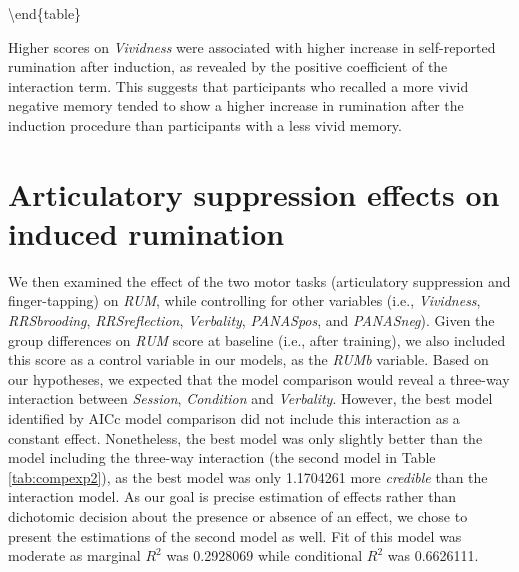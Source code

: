 \documentclass[12pt,]{book}
\theoremstyle{definition}
\theoremstyle{definition}
\theoremstyle{definition}
\theoremstyle{remark}
\begin{document}
\textbackslash{}end\{table\}

Higher scores on \emph{Vividness} were associated with higher increase
in self-reported rumination after induction, as revealed by the positive
coefficient of the interaction term. This suggests that participants who
recalled a more vivid negative memory tended to show a higher increase
in rumination after the induction procedure than participants with a
less vivid memory.

\section{Articulatory suppression effects on induced
rumination}\label{articulatory-suppression-effects-on-induced-rumination-1}

We then examined the effect of the two motor tasks (articulatory
suppression and finger-tapping) on \emph{RUM}, while controlling for
other variables (i.e., \emph{Vividness}, \emph{RRSbrooding},
\emph{RRSreflection}, \emph{Verbality}, \emph{PANASpos}, and
\emph{PANASneg}). Given the group differences on \emph{RUM} score at
baseline (i.e., after training), we also included this score as a
control variable in our models, as the \emph{RUMb} variable. Based on
our hypotheses, we expected that the model comparison would reveal a
three-way interaction between \emph{Session}, \emph{Condition} and
\emph{Verbality}. However, the best model identified by AICc model
comparison did not include this interaction as a constant effect.
Nonetheless, the best model was only slightly better than the model
including the three-way interaction (the second model in Table
\ref{tab:compexp2}), as the best model was only 1.1704261 more
\emph{credible} than the interaction model. As our goal is precise
estimation of effects rather than dichotomic decision about the presence
or absence of an effect, we chose to present the estimations of the
second model as well. Fit of this model was moderate as marginal
\(R^{2}\) was 0.2928069 while conditional \(R^{2}\) was 0.6626111.
\end{document}
